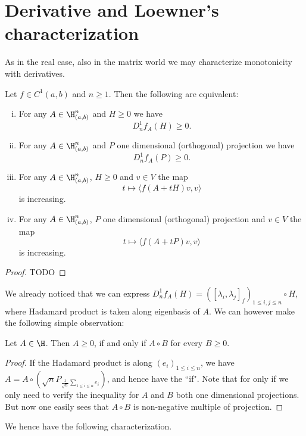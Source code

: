 \section{Derivative and Loewner's characterization}

As in the real case, also in the matrix world we may characterize monotonicity with derivatives.

\begin{lause}
	Let $f \in C^{1}(a, b)$ and $n \geq 1$. Then the following are equivalent:
	\begin{enumerate}[(i)]
	\item For any $A \in \H^{n}_{(a, b)}$ and $H \geq 0$ we have
	\[
		D^{1}_{n}f_{A}(H) \geq 0.
	\]
	\item For any $A \in \H^{n}_{(a, b)}$ and $P$ one dimensional (orthogonal) projection we have
	\[
		D^{1}_{n}f_{A}(P) \geq 0.
	\]
	\item For any $A \in \H^{n}_{(a, b)}$, $H \geq 0$ and $v \in V$ the map
	\[
		t \mapsto \langle f(A + t H) v, v \rangle
	\]
	is increasing.
	\item For any $A \in \H^{n}_{(a, b)}$, $P$ one dimensional (orthogonal) projection and $v \in V$ the map
	\[
		t \mapsto \langle f(A + t P) v, v \rangle
	\]
	is increasing.
	\end{enumerate}
\end{lause}
\begin{proof}
	TODO
\end{proof}

We already noticed that we can express $D^{1}_{n}f_{A}(H) = ([\lambda_{i}, \lambda_{j}]_{f})_{1 \leq i, j \leq n}\circ H$, where Hadamard product is taken along eigenbasis of $A$. We can however make the following simple observation:

\begin{lem}
	Let $A \in \H$. Then $A \geq 0$, if and only if $A \circ B$ for every $B \geq 0$.
\end{lem}

\begin{proof}
	If the Hadamard product is along $(e_{i})_{1 \leq i \leq n}$, we have $A = A \circ \left(\sqrt{n} P_{\frac{1}{\sqrt{n}}\sum_{1 \leq i \leq n} e_{i}} \right)$, and hence have the ``if". Note that for only if we only need to verify the inequality for $A$ and $B$ both one dimensional projections. But now one easily sees that $A \circ B$ is non-negative multiple of projection.
\end{proof}

We hence have the following characterization.

